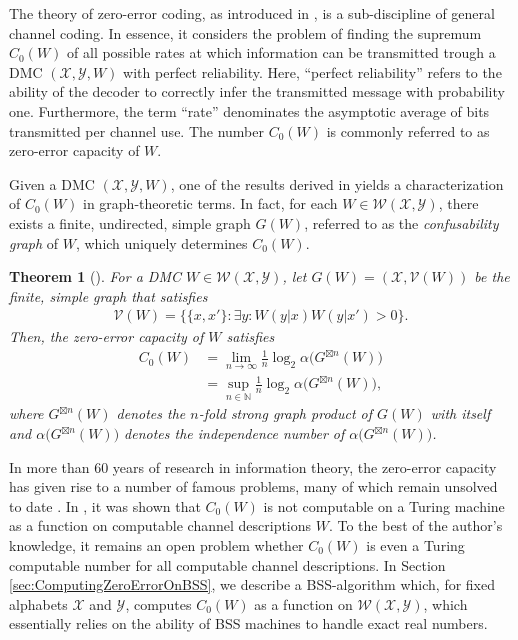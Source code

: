 \documentclass[conference]{IEEEtran}
\def\X{{\mathcal X}}
\def\Y{{\mathcal Y}}
\def\V{{\mathcal V}}
\def\W{{\mathcal W}}
\def\NN{{\mathbb N}}
\newcommand{\sdummy}{{\color{red}[SOURCE]}}
\newcommand{\tbr}[1]{}
\newtheorem{Theorem}{Theorem}
\begin{document}
	The theory of zero-error coding, as introduced in \cite{Sh56}, is a sub-discipline of general channel coding. In essence, it considers the problem of finding the supremum 
	\(C_0(W)\) of all possible rates at which information can be transmitted trough a DMC \((\X,\Y,W)\) with perfect reliability. Here, ``perfect reliability'' refers
	to the ability of the decoder to correctly infer the transmitted message with probability one. Furthermore, the term ``rate'' denominates the asymptotic average of bits transmitted per channel use. 
	The number \(C_0(W)\) is commonly referred to as zero-error capacity of \(W\).

	Given a DMC \((\X,\Y,W)\), one of the results derived in \cite{Sh56} yields a characterization of \(C_0(W)\) in graph-theoretic terms.
	In fact, for each \(W\in \W(\X,\Y)\), there exists a finite, undirected, simple graph \(G(W)\), referred to as the \emph{confusability graph} of \(W\), which
	uniquely determines \(C_0(W)\).

	\begin{Theorem}	[\cite{Sh56}]\label{thm:ZE_Capacity}
					For a DMC \(W\in\W(\X,\Y)\), let \(G(W) = (\X, \V(W))\) be the finite, simple graph that satisfies
					\begin{align*}   \V(W) = \big\{\{x,x'\} : \exists y : W(y|x)W(y|x') > 0\big\}.
					\end{align*}
					Then, the zero-error capacity of \(W\) satisfies
					\begin{align*}   C_0(W)  	&=  \lim_{n\to\infty} \frac{1}{n} \log_2 \alpha\big(G^{\boxtimes n }(W)\big) \\
												&=  \sup_{n\in\NN} \frac{1}{n} \log_2 \alpha\big(G^{\boxtimes n }(W)\big),
					\end{align*}
					where \(G^{\boxtimes n }(W)\) denotes the \(n\)-fold \emph{strong graph product} of \(G(W)\) with itself and
					\(\alpha\big(G^{\boxtimes n }(W)\big)\) denotes the \emph{independence number} of \(\alpha\big(G^{\boxtimes n }(W)\big)\).
	\end{Theorem}
	
	In more than 60 years of research in information theory, the zero-error capacity has given rise to a number of famous problems, many of which remain
	unsolved to date \tbr{\sdummy}. In \cite{BD20Z}, it was shown that \(C_0(W)\) is not computable on a Turing machine as a function on computable channel descriptions \(W\).
	To the best of the author's knowledge, it remains an open problem whether \(C_0(W)\) is even a Turing computable number for all computable channel descriptions.
	In Section \ref{sec:ComputingZeroErrorOnBSS}, we describe a BSS-algorithm which, for fixed alphabets \(\X\) and \(\Y\), computes \(C_0(W)\) as a function on \(\W(\X,\Y)\), which
	essentially relies on the ability of BSS machines to handle exact real numbers.
\end{document}
